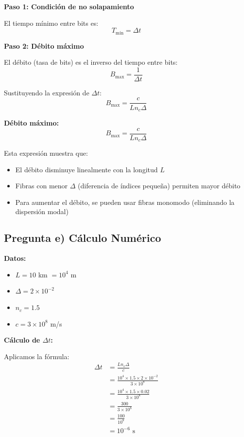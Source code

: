 \documentclass[11pt,a4paper]{article}
\begin{document}
\textbf{Paso 1: Condición de no solapamiento}

El tiempo mínimo entre bits es:
\begin{equation}
    T_{\min} = \Delta t
\end{equation}

\textbf{Paso 2: Débito máximo}

El débito (tasa de bits) es el inverso del tiempo entre bits:
\begin{equation}
    B_{\max} = \frac{1}{\Delta t}
\end{equation}

Sustituyendo la expresión de $\Delta t$:
\begin{equation}
    B_{\max} = \frac{c}{Ln_c\Delta}
\end{equation}

\textbf{Débito máximo:}
\begin{equation}
    B_{\max} = \frac{c}{Ln_c\Delta}
\end{equation}

Esta expresión muestra que:
\begin{itemize}
    \item El débito disminuye linealmente con la longitud $L$
    \item Fibras con menor $\Delta$ (diferencia de índices pequeña) permiten mayor débito
    \item Para aumentar el débito, se pueden usar fibras monomodo (eliminando la dispersión modal)
\end{itemize}

\subsection{Pregunta e) Cálculo Numérico}

\textbf{Datos:}
\begin{itemize}
    \item $L = 10$ km $= 10^4$ m
    \item $\Delta = 2 \times 10^{-2}$
    \item $n_c = 1.5$
    \item $c = 3 \times 10^8$ m/s
\end{itemize}

\textbf{Cálculo de $\Delta t$:}

Aplicamos la fórmula:
\begin{align}
    \Delta t &= \frac{Ln_c\Delta}{c} \\
    &= \frac{10^4 \times 1.5 \times 2 \times 10^{-2}}{3 \times 10^8} \\
    &= \frac{10^4 \times 1.5 \times 0.02}{3 \times 10^8} \\
    &= \frac{300}{3 \times 10^8} \\
    &= \frac{100}{10^8} \\
    &= 10^{-6} \text{ s}
\end{align}
\end{document}
